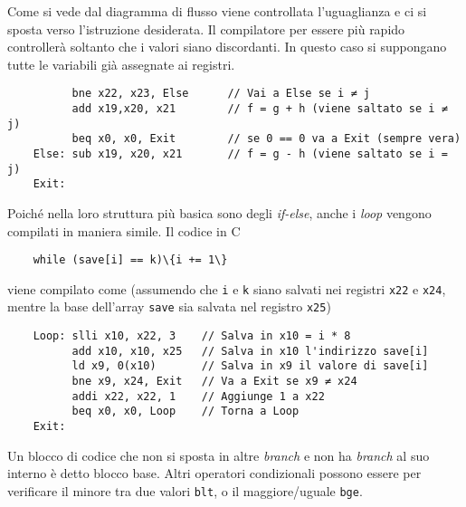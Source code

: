 \documentclass[a4paper,12pt]{article}
\theoremstyle{break}
\newcommand{\code}[1]{\texttt{#1}}
\numberwithin{equation}{section}
\begin{document}
\begin{center}
\end{center}
Come si vede dal diagramma di flusso viene controllata l'uguaglianza e ci si sposta verso l'istruzione desiderata. Il compilatore per essere più rapido controllerà soltanto che i valori siano discordanti. In questo caso si suppongano tutte le variabili già assegnate ai registri.
\begin{verbatim}
          bne x22, x23, Else      // Vai a Else se i ≠ j
          add x19,x20, x21        // f = g + h (viene saltato se i ≠ j)
          beq x0, x0, Exit        // se 0 == 0 va a Exit (sempre vera)
    Else: sub x19, x20, x21       // f = g - h (viene saltato se i = j)
    Exit: 
\end{verbatim}
Poiché nella loro struttura più basica sono degli \textit{if-else}, anche i \textit{loop} vengono compilati in maniera simile. Il codice in C 
\begin{verbatim}
    while (save[i] == k)\{i += 1\}
\end{verbatim}
viene compilato come (assumendo che \code{i} e \code{k} siano salvati nei registri \code{x22} e \code{x24}, mentre la base dell'array \code{save} sia salvata nel registro \code{x25})
\begin{verbatim}
    Loop: slli x10, x22, 3    // Salva in x10 = i * 8
          add x10, x10, x25   // Salva in x10 l'indirizzo save[i]
          ld x9, 0(x10)       // Salva in x9 il valore di save[i]
          bne x9, x24, Exit   // Va a Exit se x9 ≠ x24 
          addi x22, x22, 1    // Aggiunge 1 a x22
          beq x0, x0, Loop    // Torna a Loop
    Exit:
\end{verbatim}
Un blocco di codice che non si sposta in altre \textit{branch} e non ha \textit{branch} al suo interno è detto blocco base.  
Altri operatori condizionali possono essere per verificare il minore tra due valori \code{blt}, o il maggiore/uguale \code{bge}.
\end{document}

